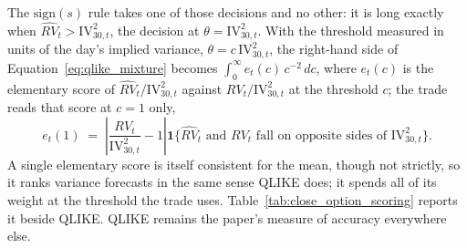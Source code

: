 The $\mathrm{sign}(s)$ rule takes one of those decisions and no other: it is
long exactly when $\widehat{RV}_t > \mathrm{IV}^2_{30,t}$, the decision at
$\theta = \mathrm{IV}^2_{30,t}$. With the threshold measured in units of the
day's implied variance, $\theta = c\,\mathrm{IV}^2_{30,t}$, the right-hand side
of Equation~\eqref{eq:qlike_mixture} becomes $\int_0^\infty e_t(c)\,c^{-2}\,dc$,
where $e_t(c)$ is the elementary score of $\widehat{RV}_t/\mathrm{IV}^2_{30,t}$
against $RV_t/\mathrm{IV}^2_{30,t}$ at the threshold $c$; the trade reads that
score at $c = 1$ only,
\begin{equation}
    e_t(1) \;=\; \left|\frac{RV_t}{\mathrm{IV}^2_{30,t}} - 1\right|
    \mathbf{1}\bigl\{\widehat{RV}_t \text{ and } RV_t
    \text{ fall on opposite sides of } \mathrm{IV}^2_{30,t}\bigr\}.
    \label{eq:score_at_threshold}
\end{equation}
A single elementary score is itself consistent for the mean, though not
strictly, so it ranks variance forecasts in the same sense QLIKE does; it
spends all of its weight at the threshold the trade uses.
Table~\ref{tab:close_option_scoring} reports it beside QLIKE. QLIKE remains
the paper's measure of accuracy everywhere else.

\begin{table}[H]
\centering
\caption{The 15:30 forecasts scored two ways, on the 866 expiration days of
Section~\ref{sec:close_option_results}. QLIKE is Equation~\eqref{eq:dp_qlike}
applied to the $16{:}00$ row; the score at the threshold is
Equation~\eqref{eq:score_at_threshold}, averaged over days (lower is better
for both). ``Same side as $RV$'' is the percentage of days on which
$\widehat{RV}_t$ and $RV_t$ fall on the same side of
$\mathrm{IV}^2_{30,t}$; ``same side as $R$'' the percentage on which the
$\mathrm{sign}(s)$ position has the sign of the settlement return. The last
column is the annualized Sharpe ratio of the $\mathrm{sign}(s)$ portfolio at
the crossed spread. The last row is a rule told $RV_t$ in advance. $\dagger$:
the four columns still fitted on the earlier design panel
(Section~\ref{sec:close_option_methods}).
\label{tab:close_option_scoring}}
\resizebox{\textwidth}{!}{}
\end{table}

